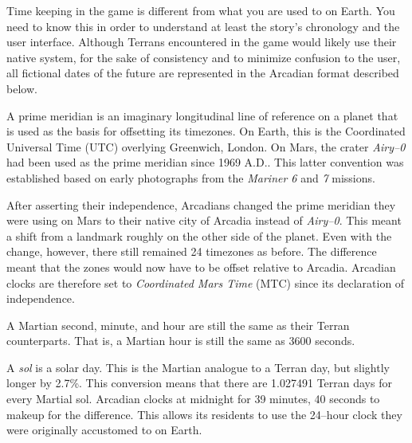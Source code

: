 

Time keeping in the game is different from what you are used to on Earth. You need to know this in order to understand at least the story's chronology and the user interface. Although Terrans encountered in the game would likely use their native system, for the sake of consistency and to minimize confusion to the user, all fictional dates of the future are represented in the Arcadian format described below.


A prime meridian is an imaginary longitudinal line of reference on a planet that is used as the basis for offsetting its timezones. On Earth, this is the Coordinated Universal Time (UTC) overlying Greenwich, London. On Mars, the crater {\it Airy--0} had been used as the prime meridian since 1969 A.D.. This latter convention was established based on early photographs from the {\it Mariner 6} and {\it 7} missions.

After asserting their independence, Arcadians changed the prime meridian they were using on Mars to their native city of Arcadia instead of {\it Airy--0}. This meant a shift from a landmark roughly on the other side of the planet. Even with the change, however, there still remained 24 timezones as before. The difference meant that the zones would now have to be offset relative to Arcadia. Arcadian clocks are therefore set to {\it Coordinated Mars Time} (MTC) since its declaration of independence.


A Martian second, minute, and hour are still the same as their Terran counterparts. That is, a Martian hour is still the same as 3600  seconds.

A {\it sol} is a solar day. This is the Martian analogue to a Terran day, but slightly longer by 2.7\%. This conversion means that there are 1.027491 Terran days for every Martial sol. Arcadian clocks  at midnight for 39 minutes, 40 seconds to makeup for the difference. This allows its residents to use the 24--hour clock they were originally accustomed to on Earth.

